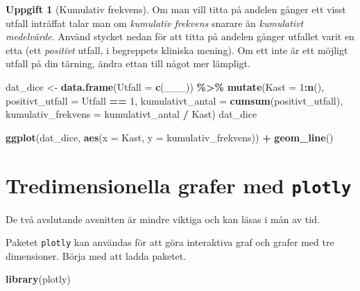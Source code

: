 \documentclass[
]{book}
\newenvironment{Shaded}{\begin{snugshade}}{\end{snugshade}}
\newcommand{\AttributeTok}[1]{\textcolor[rgb]{0.13,0.29,0.53}{#1}}
\newcommand{\DecValTok}[1]{\textcolor[rgb]{0.00,0.00,0.81}{#1}}
\newcommand{\FunctionTok}[1]{\textcolor[rgb]{0.13,0.29,0.53}{\textbf{#1}}}
\newcommand{\NormalTok}[1]{#1}
\newcommand{\OtherTok}[1]{\textcolor[rgb]{0.56,0.35,0.01}{#1}}
\newcommand{\SpecialCharTok}[1]{\textcolor[rgb]{0.81,0.36,0.00}{\textbf{#1}}}
\theoremstyle{definition}
\theoremstyle{definition}
\theoremstyle{definition}
\newtheorem{exercise}{Uppgift}[chapter]
\theoremstyle{definition}
\theoremstyle{remark}
\begin{document}
\begin{exercise}[Kumulativ frekvens]

Om man vill titta på andelen gånger ett visst utfall inträffat talar man om \emph{kumulativ frekvens} snarare än \emph{kumulativt medelvärde}. Använd stycket nedan för att titta på andelen gånger utfallet varit en etta (ett \emph{positivt} utfall, i begreppets kliniska mening). Om ett inte är ett möjligt utfall på din tärning, ändra ettan till något mer lämpligt.

\begin{Shaded}
\begin{Highlighting}[]
\NormalTok{dat\_dice }\OtherTok{\textless{}{-}} \FunctionTok{data.frame}\NormalTok{(}\AttributeTok{Utfall =} \FunctionTok{c}\NormalTok{(\_\_\_)) }\SpecialCharTok{\%\textgreater{}\%} 
  \FunctionTok{mutate}\NormalTok{(}\AttributeTok{Kast =} \DecValTok{1}\SpecialCharTok{:}\FunctionTok{n}\NormalTok{(),}
         \AttributeTok{positivt\_utfall =}\NormalTok{ Utfall }\SpecialCharTok{==} \DecValTok{1}\NormalTok{,              }
         \AttributeTok{kumulativt\_antal =} \FunctionTok{cumsum}\NormalTok{(positivt\_utfall),}
         \AttributeTok{kumulativ\_frekvens =}\NormalTok{ kumulativt\_antal }\SpecialCharTok{/}\NormalTok{ Kast)}
\NormalTok{dat\_dice}

\FunctionTok{ggplot}\NormalTok{(dat\_dice, }\FunctionTok{aes}\NormalTok{(}\AttributeTok{x =}\NormalTok{ Kast, }\AttributeTok{y =}\NormalTok{ kumulativ\_frekvens)) }\SpecialCharTok{+}
  \FunctionTok{geom\_line}\NormalTok{()}
\end{Highlighting}
\end{Shaded}

\end{exercise}

\section{\texorpdfstring{Tredimensionella grafer med \texttt{plotly}}{Tredimensionella grafer med plotly}}\label{tredimensionella-grafer-med-plotly}

De två avslutande avsnitten är mindre viktiga och kan läsas i mån av tid.

Paketet \texttt{plotly} kan användas för att göra interaktiva graf och grafer med tre dimensioner. Börja med att ladda paketet.

\begin{Shaded}
\begin{Highlighting}[]
\FunctionTok{library}\NormalTok{(plotly)}
\end{Highlighting}
\end{Shaded}
\end{document}
